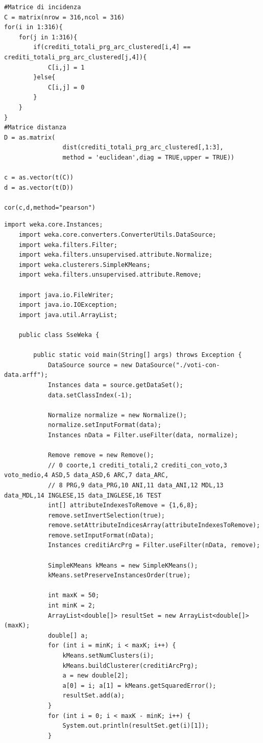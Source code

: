 \documentclass[12pt]{article}
\begin{document}
\begin{lstlisting}[caption={Calcolo Matrice di incidenza dei cluster, delle distanze e correlazione tra le due matrici.}, label={matrix-cor1}, captionpos=b, style = R]
#Matrice di incidenza
C = matrix(nrow = 316,ncol = 316)
for(i in 1:316){
    for(j in 1:316){
		if(crediti_totali_prg_arc_clustered[i,4] == crediti_totali_prg_arc_clustered[j,4]){
            C[i,j] = 1
        }else{
            C[i,j] = 0
        }
    }
}
#Matrice distanza
D = as.matrix(
				dist(crediti_totali_prg_arc_clustered[,1:3],
				method = 'euclidean',diag = TRUE,upper = TRUE))

c = as.vector(t(C))
d = as.vector(t(D))

cor(c,d,method="pearson")
\end{lstlisting}	

\begin{lstlisting}[caption={Codice Java per il calcolo di SSE al variare di K}, label={javasse}, captionpos=b, style = java]
	import weka.core.Instances;
	import weka.core.converters.ConverterUtils.DataSource;
	import weka.filters.Filter;
	import weka.filters.unsupervised.attribute.Normalize;
	import weka.clusterers.SimpleKMeans;
	import weka.filters.unsupervised.attribute.Remove;
	
	import java.io.FileWriter;
	import java.io.IOException;
	import java.util.ArrayList;
	
	public class SseWeka {
	
		public static void main(String[] args) throws Exception {
			DataSource source = new DataSource("./voti-con-data.arff");
			Instances data = source.getDataSet();
			data.setClassIndex(-1);
	
			Normalize normalize = new Normalize();
			normalize.setInputFormat(data);
			Instances nData = Filter.useFilter(data, normalize);
	
			Remove remove = new Remove();
			// 0 coorte,1 crediti_totali,2 crediti_con_voto,3 voto_medio,4 ASD,5 data_ASD,6 ARC,7 data_ARC,
			// 8 PRG,9 data_PRG,10 ANI,11 data_ANI,12 MDL,13 data_MDL,14 INGLESE,15 data_INGLESE,16 TEST
			int[] attributeIndexesToRemove = {1,6,8};
			remove.setInvertSelection(true);
			remove.setAttributeIndicesArray(attributeIndexesToRemove);
			remove.setInputFormat(nData);
			Instances creditiArcPrg = Filter.useFilter(nData, remove);
	
			SimpleKMeans kMeans = new SimpleKMeans();
			kMeans.setPreserveInstancesOrder(true);
	
			int maxK = 50;
			int minK = 2;
			ArrayList<double[]> resultSet = new ArrayList<double[]>(maxK);
			double[] a;
			for (int i = minK; i < maxK; i++) {
				kMeans.setNumClusters(i);
				kMeans.buildClusterer(creditiArcPrg);
				a = new double[2];
				a[0] = i; a[1] = kMeans.getSquaredError();
				resultSet.add(a);
			}
			for (int i = 0; i < maxK - minK; i++) {
				System.out.println(resultSet.get(i)[1]);
			}
	

\end{lstlisting}
\end{document}

